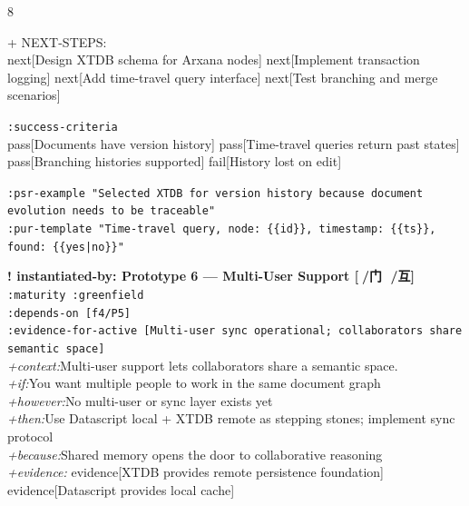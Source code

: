 \documentclass[landscape]{article}
\newcommand{\flexitag}[1]{\textcolor[gray]{0.35}{\textit{#1}}}
\newenvironment{devmapgreenfield}{%
  \def\FrameCommand{\colorbox{devmapgreenfieldbg}}%
  \setlength{\fboxsep}{2pt}%
  \MakeFramed{\advance\hsize-\width \FrameRestore}%
}{\endMakeFramed}
\begin{document}
\begin{paracol}{8}
\begin{devmapgreenfield}
\par
  + NEXT-STEPS:\\
    next[Design XTDB schema for Arxana nodes] next[Implement transaction logging] next[Add time-travel query interface] next[Test branching and merge scenarios]\\
\par
  \texttt{:\allowbreak{}success-\allowbreak{}criteria}\\
    pass[Documents have version history] pass[Time-travel queries return past states] pass[Branching histories supported] fail[History lost on edit]\\
\par
  \texttt{:\allowbreak{}psr-\allowbreak{}example "Selected XTDB for version history because document evolution needs to be traceable"}\\
  \texttt{:\allowbreak{}pur-\allowbreak{}template "Time-\allowbreak{}travel query,\allowbreak{} node:\allowbreak{} \{\{id\}\},\allowbreak{} timestamp:\allowbreak{} \{\{ts\}\},\allowbreak{} found:\allowbreak{} \{\{yes|\allowbreak{}no\}\}"}\\
\par
\par
\end{devmapgreenfield}
\begin{devmapgreenfield}
\textbf{! instantiated-by: Prototype 6 — Multi-User Support [🔦/门 🙅/互]}\\
  \texttt{:\allowbreak{}maturity :\allowbreak{}greenfield}\\
  \texttt{:\allowbreak{}depends-\allowbreak{}on [f4/\allowbreak{}P5]}\\
  \texttt{:\allowbreak{}evidence-\allowbreak{}for-\allowbreak{}active [Multi-\allowbreak{}user sync operational;\allowbreak{} collaborators share semantic space]}\\
  \flexitag{+context:}Multi-user support lets collaborators share a semantic space.\\
  \flexitag{+if:}You want multiple people to work in the same document graph\\
  \flexitag{+however:}No multi-user or sync layer exists yet\\
  \flexitag{+then:}Use Datascript local + XTDB remote as stepping stones; implement sync protocol\\
  \flexitag{+because:}Shared memory opens the door to collaborative reasoning\\
  \flexitag{+evidence:} evidence[XTDB provides remote persistence foundation] evidence[Datascript provides local cache]\\

\end{devmapgreenfield}
\end{paracol}
\end{document}
